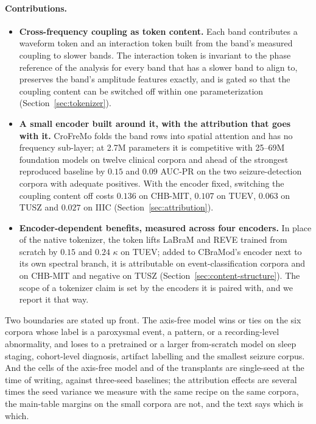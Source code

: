 \paragraph{Contributions.}
\begin{itemize}[leftmargin=*,itemsep=2pt,topsep=2pt]
\item \textbf{Cross-frequency coupling as token content.} Each band
  contributes a waveform token and an interaction token built from the
  band's measured coupling to slower bands. The interaction token is
  invariant to the phase reference of the analysis for every band that has
  a slower band to align to, preserves the band's amplitude features
  exactly, and is gated so that the coupling content can be switched off
  within one parameterization (Section~\ref{sec:tokenizer}).
\item \textbf{A small encoder built around it, with the attribution that
  goes with it.} CroFreMo folds the band rows into spatial attention and
  has no frequency sub-layer; at 2.7M parameters it is competitive with
  25--69M foundation models on twelve clinical corpora and ahead of the
  strongest reproduced baseline by $0.15$ and $0.09$ AUC-PR on the two
  seizure-detection corpora with adequate positives. With the encoder
  fixed, switching the coupling content off costs $0.136$ on CHB-MIT,
  $0.107$ on TUEV, $0.063$ on TUSZ and $0.027$ on IIIC
  (Section~\ref{sec:attribution}).
\item \textbf{Encoder-dependent benefits, measured across four
  encoders.} In place of the native tokenizer, the token lifts LaBraM and
  REVE trained from scratch by $0.15$ and $0.24$ $\kappa$ on TUEV; added to
  CBraMod's encoder next to its own spectral branch, it is attributable on
  event-classification corpora and on CHB-MIT and negative on TUSZ
  (Section~\ref{sec:content-structure}). The scope of a tokenizer claim is
  set by the encoders it is paired with, and we report it that way.
\end{itemize}

Two boundaries are stated up front. The axis-free model wins or ties on
the six corpora whose label is a paroxysmal event, a pattern, or a
recording-level abnormality, and loses to a pretrained or a larger
from-scratch model on sleep staging, cohort-level diagnosis, artifact
labelling and the smallest seizure corpus. And the cells of the axis-free
model and of the transplants are single-seed at the time of writing,
against three-seed baselines; the attribution effects are several times
the seed variance we measure with the same recipe on the same corpora,
the main-table margins on the small corpora are not, and the text says
which is which.
